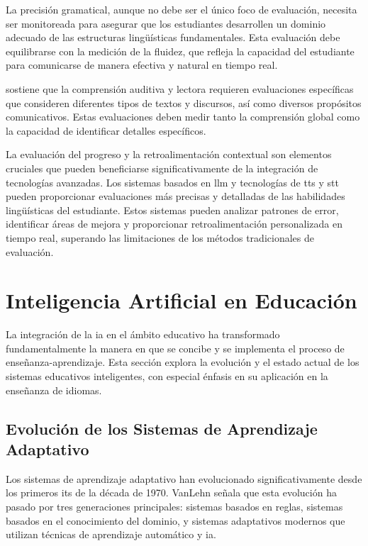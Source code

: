 La precisión gramatical, aunque no debe ser el único foco de evaluación, necesita ser monitoreada para asegurar que los estudiantes desarrollen un dominio adecuado de las estructuras lingüísticas fundamentales. Esta evaluación debe equilibrarse con la medición de la fluidez, que refleja la capacidad del estudiante para comunicarse de manera efectiva y natural en tiempo real.

\cite{krashen1982principles} sostiene que la comprensión auditiva y lectora requieren evaluaciones específicas que consideren diferentes tipos de textos y discursos, así como diversos propósitos comunicativos. Estas evaluaciones deben medir tanto la comprensión global como la capacidad de identificar detalles específicos.

La evaluación del progreso y la retroalimentación contextual son elementos cruciales que pueden beneficiarse significativamente de la integración de tecnologías avanzadas. Los sistemas basados en \gls{llm} y tecnologías de \gls{tts} y \gls{stt} pueden proporcionar evaluaciones más precisas y detalladas de las habilidades lingüísticas del estudiante. Estos sistemas pueden analizar patrones de error, identificar áreas de mejora y proporcionar retroalimentación personalizada en tiempo real, superando las limitaciones de los métodos tradicionales de evaluación.




\section{Inteligencia Artificial en Educación}

La integración de la \gls{ia} en el ámbito educativo ha transformado fundamentalmente la manera en que se concibe y se implementa el proceso de enseñanza-aprendizaje. Esta sección explora la evolución y el estado actual de los sistemas educativos inteligentes, con especial énfasis en su aplicación en la enseñanza de idiomas.

\subsection{Evolución de los Sistemas de Aprendizaje Adaptativo}
Los sistemas de aprendizaje adaptativo han evolucionado significativamente desde los primeros \gls{its} de la década de 1970. VanLehn \cite{vanlehn2011relative} señala que esta evolución ha pasado por tres generaciones principales: sistemas basados en reglas, sistemas basados en el conocimiento del dominio, y sistemas adaptativos modernos que utilizan técnicas de aprendizaje automático y \gls{ia}.

